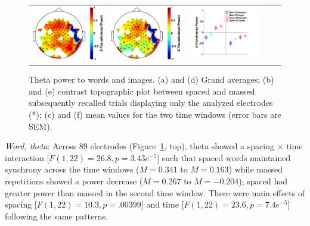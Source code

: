 \begin{figure}[H]
\begin{tabular}{ccccc}
  \includegraphics[width=.19\textwidth]{./figs/exp1/tfr_topocont_ga_img_RgH_rc_spac_p2vsimg_RgH_rc_mass_p2_99ROIs_4_8_0_500_-1p0_1p0_cb} &
  \includegraphics[width=.19\textwidth]{./figs/exp1/tfr_topocont_ga_img_RgH_rc_spac_p2vsimg_RgH_rc_mass_p2_99ROIs_4_8_520_1000_-1p0_1p0_cb} &
  \includegraphics[width=.30\textwidth]{./figs/exp1/tfr_avg_ga_img_RgH_rc_mass_p2_img_RgH_fo_mass_p2_img_RgH_rc_spac_p2_img_RgH_fo_spac_p2_99ROI_0_500_500_1000_4_8_ylabel} \\
  \end{tabular}
  \caption{Theta power to words and images.  (a) and (d) Grand averages; (b) and (e) contrast topographic plot between spaced and massed subsequently recalled trials displaying only the analyzed electrodes (*); (c) and (f) mean values for the two time windows (error bars are SEM).}
  \label{fig:word_img_theta}
\end{figure}

\textit{Word, theta}: Across 89 electrodes (Figure~\ref{fig:word_img_theta}, top), theta showed a spacing $\times$ time interaction [$F(1,22)=26.8, p=3.43e^{-5}$] such that spaced words maintained synchrony across the time windows ($M=0.341$ to $M=0.163$) while massed repetitions showed a power decrease ($M=0.267$ to $M=-0.204$); spaced had greater power than massed in the second time window.
There were main effects of spacing [$F(1,22)=10.3, p=.00399$] and time [$F(1,22)=23.6, p=7.4e^{-5}$] following the same patterns.


